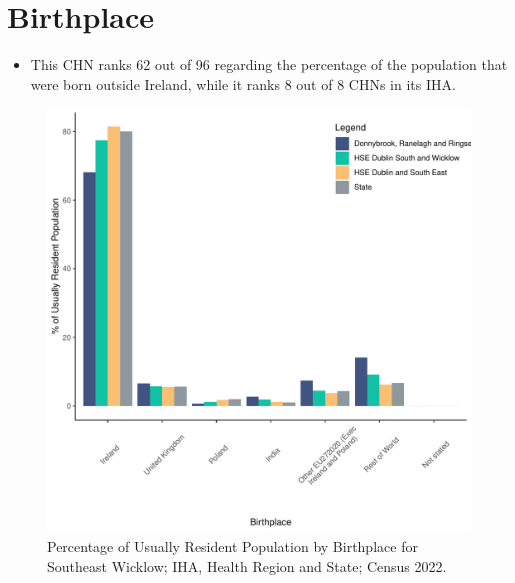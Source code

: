 \documentclass{article}
\begin{document}
\section{Birthplace}\label{sect:Birth}
\begin{itemize}
\item This CHN ranks  62 out of 96 regarding the percentage of the population that were born outside Ireland, while it ranks  8 out of 8 CHNs in its IHA.
\end{itemize}
\begin{figure}[H]
	\centering
	\includegraphics[width = 130mm]{../figures/BirthED.pdf}
	\caption{Percentage of Usually Resident Population by Birthplace for Southeast Wicklow; IHA, Health Region and State; Census 2022.}
	\label{fig:vbnv}
	\end{figure}
	
\end{document}

